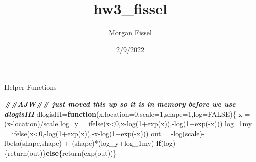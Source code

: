 \documentclass[
]{article}
\title{hw3\_fissel}
\author{Morgan Fissel}
\date{2/9/2022}
\newenvironment{Shaded}{\begin{snugshade}}{\end{snugshade}}
\newcommand{\AttributeTok}[1]{\textcolor[rgb]{0.77,0.63,0.00}{#1}}
\newcommand{\CommentTok}[1]{\textcolor[rgb]{0.56,0.35,0.01}{\textit{#1}}}
\newcommand{\ConstantTok}[1]{\textcolor[rgb]{0.00,0.00,0.00}{#1}}
\newcommand{\ControlFlowTok}[1]{\textcolor[rgb]{0.13,0.29,0.53}{\textbf{#1}}}
\newcommand{\DecValTok}[1]{\textcolor[rgb]{0.00,0.00,0.81}{#1}}
\newcommand{\DocumentationTok}[1]{\textcolor[rgb]{0.56,0.35,0.01}{\textbf{\textit{#1}}}}
\newcommand{\FunctionTok}[1]{\textcolor[rgb]{0.00,0.00,0.00}{#1}}
\newcommand{\NormalTok}[1]{#1}
\newcommand{\OtherTok}[1]{\textcolor[rgb]{0.56,0.35,0.01}{#1}}
\newcommand{\SpecialCharTok}[1]{\textcolor[rgb]{0.00,0.00,0.00}{#1}}
\begin{document}
\maketitle

\begin{Shaded}
\end{Shaded}

Helper Functions

\begin{Shaded}
\begin{Highlighting}[]
\DocumentationTok{\#\#AJW\#\# just moved this up so it is in memory before we use dlogisIII}
\NormalTok{dlogisIII}\OtherTok{=}\ControlFlowTok{function}\NormalTok{(x,}\AttributeTok{location=}\DecValTok{0}\NormalTok{,}\AttributeTok{scale=}\DecValTok{1}\NormalTok{,}\AttributeTok{shape=}\DecValTok{1}\NormalTok{,}\AttributeTok{log=}\ConstantTok{FALSE}\NormalTok{)\{}
\NormalTok{  x }\OtherTok{=}\NormalTok{ (x}\SpecialCharTok{{-}}\NormalTok{location)}\SpecialCharTok{/}\NormalTok{scale}
\NormalTok{  log\_y }\OtherTok{=} \FunctionTok{ifelse}\NormalTok{(x}\SpecialCharTok{\textless{}}\DecValTok{0}\NormalTok{,x}\SpecialCharTok{{-}}\FunctionTok{log}\NormalTok{(}\DecValTok{1}\SpecialCharTok{+}\FunctionTok{exp}\NormalTok{(x)),}\SpecialCharTok{{-}}\FunctionTok{log}\NormalTok{(}\DecValTok{1}\SpecialCharTok{+}\FunctionTok{exp}\NormalTok{(}\SpecialCharTok{{-}}\NormalTok{x)))}
\NormalTok{  log\_1my }\OtherTok{=} \FunctionTok{ifelse}\NormalTok{(x}\SpecialCharTok{\textless{}}\DecValTok{0}\NormalTok{,}\SpecialCharTok{{-}}\FunctionTok{log}\NormalTok{(}\DecValTok{1}\SpecialCharTok{+}\FunctionTok{exp}\NormalTok{(x)),}\SpecialCharTok{{-}}\NormalTok{x}\SpecialCharTok{{-}}\FunctionTok{log}\NormalTok{(}\DecValTok{1}\SpecialCharTok{+}\FunctionTok{exp}\NormalTok{(}\SpecialCharTok{{-}}\NormalTok{x)))}
\NormalTok{  out }\OtherTok{=} \SpecialCharTok{{-}}\FunctionTok{log}\NormalTok{(scale)}\SpecialCharTok{{-}}\FunctionTok{lbeta}\NormalTok{(shape,shape) }\SpecialCharTok{+}\NormalTok{ (shape)}\SpecialCharTok{*}\NormalTok{(log\_y}\SpecialCharTok{+}\NormalTok{log\_1my)}
  \ControlFlowTok{if}\NormalTok{(log)\{}\FunctionTok{return}\NormalTok{(out)\}}\ControlFlowTok{else}\NormalTok{\{}\FunctionTok{return}\NormalTok{(}\FunctionTok{exp}\NormalTok{(out))\}}

\end{Highlighting}
\end{Shaded}
\end{document}
